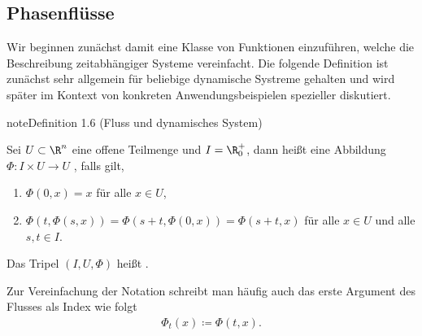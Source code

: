 \documentclass[letterpaper,10pt,german]{jupyterBook}
\begin{document}
\subsection{Phasenflüsse}
\label{\detokenize{ode/fluesse:phasenflusse}}
\sphinxAtStartPar
Wir beginnen zunächst damit eine Klasse von Funktionen einzuführen, welche die Beschreibung zeitabhängiger Systeme vereinfacht.
Die folgende Definition ist zunächst sehr allgemein für beliebige dynamische Systreme gehalten und wird später im Kontext von konkreten Anwendungsbeispielen spezieller diskutiert.
\label{ode/fluesse:def:Fluss}
\begin{sphinxadmonition}{note}{Definition 1.6 (Fluss und dynamisches System)}



\sphinxAtStartPar
Sei \(U \subset \R^n\) eine offene Teilmenge und \(I=\R^+_0\), dann heißt eine Abbildung \(\Phi:I\times U\rightarrow U\) , falls gilt,
\begin{enumerate}
%
\item {} 
\sphinxAtStartPar
\(\Phi(0, x) = x\) für alle \(x\in U\),

\item {} 
\sphinxAtStartPar
\(\Phi(t, \Phi(s,x)) = \Phi(s + t, \Phi(0, x)) = \Phi(s + t, x)\) für alle \(x\in U\) und alle \(s,t\in I\).

\end{enumerate}

\sphinxAtStartPar
Das Tripel \((I, U, \Phi)\) heißt .

\sphinxAtStartPar
Zur Vereinfachung der Notation schreibt man häufig auch das erste Argument des Flusses als Index wie folgt
\begin{equation*}
\begin{split}\Phi_t(x) \coloneqq \Phi(t, x).\end{split}
\end{equation*}\end{sphinxadmonition}
\end{document}
